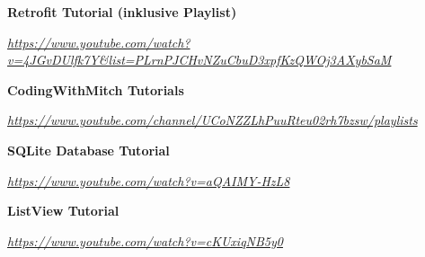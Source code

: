 \documentclass{scrartcl}
\begin{document}
\noindent \textbf{Retrofit Tutorial (inklusive Playlist)}

\noindent \textit{\url{https://www.youtube.com/watch?v=4JGvDUlfk7Y\&list=PLrnPJCHvNZuCbuD3xpfKzQWOj3AXybSaM} \newline}

\noindent \textbf{CodingWithMitch Tutorials}

\noindent \textit{\url{https://www.youtube.com/channel/UCoNZZLhPuuRteu02rh7bzsw/playlists} \newline}

\noindent \textbf{SQLite Database Tutorial}

\noindent \textit{\url{https://www.youtube.com/watch?v=aQAIMY-HzL8} \newline}

\noindent \textbf{ListView Tutorial}

\noindent \textit{\url{https://www.youtube.com/watch?v=cKUxiqNB5y0} \newline}

\newpage
\end{document}
